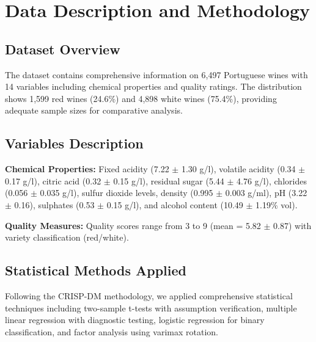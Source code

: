 \chapter{Data Description and Methodology}

\section{Dataset Overview}
The dataset contains comprehensive information on 6,497 Portuguese wines with 14 variables including chemical properties and quality ratings. The distribution shows 1,599 red wines (24.6\%) and 4,898 white wines (75.4\%), providing adequate sample sizes for comparative analysis.

\section{Variables Description}
\textbf{Chemical Properties:} Fixed acidity (7.22 $\pm$ 1.30 g/l), volatile acidity (0.34 $\pm$ 0.17 g/l), citric acid (0.32 $\pm$ 0.15 g/l), residual sugar (5.44 $\pm$ 4.76 g/l), chlorides (0.056 $\pm$ 0.035 g/l), sulfur dioxide levels, density (0.995 $\pm$ 0.003 g/ml), pH (3.22 $\pm$ 0.16), sulphates (0.53 $\pm$ 0.15 g/l), and alcohol content (10.49 $\pm$ 1.19\% vol).

\textbf{Quality Measures:} Quality scores range from 3 to 9 (mean = 5.82 $\pm$ 0.87) with variety classification (red/white).

\section{Statistical Methods Applied}
Following the CRISP-DM methodology, we applied comprehensive statistical techniques including two-sample t-tests with assumption verification, multiple linear regression with diagnostic testing, logistic regression for binary classification, and factor analysis using varimax rotation.